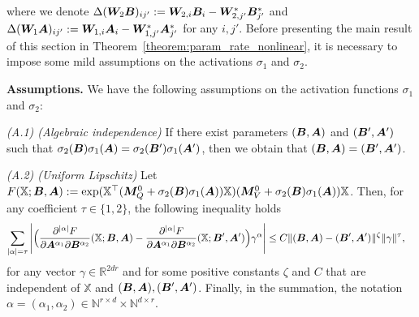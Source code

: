 where we denote $\Delta (\bm{W}_2{\bm B})_{ij'}:=\bm{W}_{2,i}{\bm B}_{i}-\bm{W}^*_{2,j'}{\bm B}^*_{j'}$ and $\Delta (\bm{W}_{1}{\bm A})_{ij'}:=\bm{W}_{1,i}{\bm A}_{i}-\bm{W}^*_{1,j'}{\bm A}^*_{j'}$  for any $i, j'$. Before presenting the main result of this section in Theorem~\ref{theorem:param_rate_nonlinear}, it is necessary to impose some mild assumptions on the activations $\sigma_1$ and $\sigma_2$. 

\vspace{0.5 em}
\noindent
\textbf{Assumptions.} We have the following assumptions on the activation functions $\sigma_1$ and $\sigma_2$:

\noindent
\emph{(A.1) (Algebraic independence)} If there exist parameters $({\bm B},{\bm A})$ and $({\bm B}',{\bm A}')$ such that $\sigma_2({\bm B})\sigma_1({\bm A})=\sigma_2({\bm B}')\sigma_1({\bm A}')$, then we obtain that $({\bm B},{\bm A})=({\bm B}',{\bm A}')$. 

\noindent
\emph{(A.2) (Uniform Lipschitz)} Let $F(\mathbb{X};{\bm B},{\bm A}):=\exp(\mathbb{X}^{\top}({\bm M}^0_{Q}+\sigma_2({\bm B})\sigma_1({\bm A}))\mathbb{X})({\bm M}^0_{V}+\sigma_2({\bm B})\sigma_1({\bm A}))\mathbb{X}$. Then, for any coefficient $\tau\in\{1,2\}$, the following inequality holds
    \begin{align*}
        \sum_{|\alpha|=\tau}\Bigg|\Big(\frac{\partial^{|\alpha|}F}{\partial {\bm A}^{\alpha_1}\partial {\bm B}^{\alpha_2}}(\mathbb{X};{\bm B},{\bm A})&-\frac{\partial^{|\alpha|}F}{\partial {\bm A}^{\alpha_1}\partial {\bm B}^{\alpha_2}}(\mathbb{X};{\bm B}',{\bm A}')\Big)\gamma^{\alpha}\Bigg|\leq C\|({\bm B},{\bm A})-({\bm B}',{\bm A}')\|^{\zeta}\|\gamma\|^{\tau},
    \end{align*}
    for any vector $\gamma\in\mathbb{R}^{2dr}$ and for some positive constants $\zeta$ and $C$ that are independent of $\mathbb{X}$ and $({\bm B},{\bm A}),({\bm B}',{\bm A}')$. Finally, in the summation, the notation $\alpha=(\alpha_1,\alpha_2)\in\mathbb{N}^{r\times d}\times\mathbb{N}^{d\times r}$.

